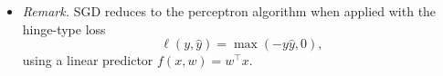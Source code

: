 \documentclass[a4paper]{article}
\begin{document}
\begin{itemize}
\begin{itemize}
            \item \textit{Remark.}  
            SGD reduces to the perceptron algorithm when applied with the hinge-type loss  
            \[
                \ell(y, \hat{y}) = \max(-y \hat{y}, 0),
            \]  
            using a linear predictor $f(x, w) = w^\top x$.
        \end{itemize}
\end{itemize}
\end{document}
